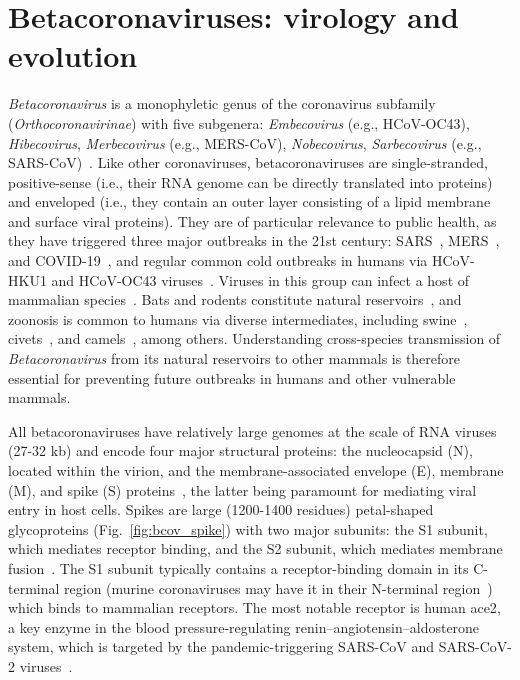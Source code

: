 

\section{Betacoronaviruses: virology and evolution}

\textit{Betacoronavirus} is a monophyletic genus of the coronavirus subfamily (\textit{Orthocoronavirinae}) with five subgenera: \textit{Embecovirus} (e.g., HCoV-OC43), \textit{Hibecovirus}, \textit{Merbecovirus} (e.g., MERS-CoV), \textit{Nobecovirus}, \textit{Sarbecovirus} (e.g., SARS-CoV)~\cite{woo2023}. Like other coronaviruses, betacoronaviruses are single-stranded, positive-sense (i.e., their RNA genome can be directly translated into proteins) and enveloped (i.e., they contain an outer layer consisting of a lipid membrane and surface viral proteins). They are of particular relevance to public health, as they have triggered three major outbreaks in the 21st century: SARS~\cite{ksiazek2003, drosten2003, rota2003}, MERS~\cite{zaki2012}, and COVID-19~\cite{huang2020, zhu2020}, and regular common cold outbreaks in humans via HCoV-HKU1 and HCoV-OC43 viruses~\cite{jackson2022, woo2023}. Viruses in this group can infect a host of mammalian species~\cite{woo2023}. Bats and rodents constitute natural reservoirs~\cite{li2005, ruiz-aravena2022, wang2020}, and zoonosis is common to humans via diverse intermediates, including swine~\cite{cui2019}, civets~\cite{ge2013}, and camels~\cite{azhar2014}, among others. Understanding cross-species transmission of \textit{Betacoronavirus} from its natural reservoirs to other mammals is therefore essential for preventing future outbreaks in humans and other vulnerable mammals.



All betacoronaviruses have relatively large genomes at the scale of RNA viruses (27-32 kb) and encode four major structural proteins: the nucleocapsid (N), located within the virion, and the membrane-associated envelope (E), membrane (M), and spike (S) proteins~\cite{flint2020, woo2023}, the latter being paramount for mediating viral entry in host cells. Spikes are large (1200-1400 residues) petal-shaped glycoproteins (Fig.~\ref{fig:bcov_spike}) with two major subunits: the S1 subunit, which mediates receptor binding, and the S2 subunit, which mediates membrane fusion~\cite{jackson2022}. The S1 subunit typically contains a receptor-binding domain in its C-terminal region (murine coronaviruses may have it in their N-terminal region~\cite{belouzard2012}) which binds to mammalian receptors. The most notable receptor is human \gls{ace2}, a key enzyme in the blood pressure-regulating renin–angiotensin–aldosterone system, which is targeted by the pandemic-triggering SARS-CoV and SARS-CoV-2 viruses~\cite{starr2022, lan2020, hoffmann2020}.

